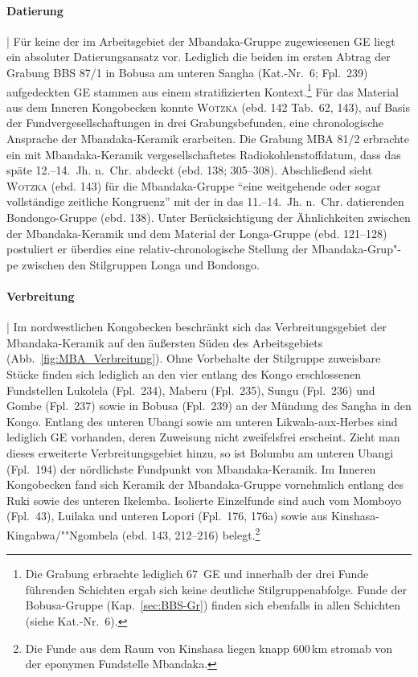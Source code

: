 \paragraph{Datierung}\hspace{-.5em}|\hspace{.5em}%
Für keine der im Arbeitsgebiet der Mbandaka-Gruppe zugewiesenen GE liegt ein absoluter Datierungsansatz vor. Lediglich die beiden im ersten Abtrag der Grabung BBS 87/1 in Bobusa am unteren \mbox{Sangha} (Kat.-Nr.~6; Fpl.~239) aufgedeckten GE stammen aus einem stratifizierten Kontext.\footnote{Die Grabung erbrachte lediglich 67~GE und innerhalb der drei Funde führenden Schichten ergab sich keine deutliche Stilgruppenabfolge. Funde der Bobusa-Gruppe (Kap.~\ref{sec:BBS-Gr}) finden sich ebenfalls in allen Schichten (siehe Kat.-Nr.~6).} Für das Material aus dem Inneren Kongobecken konnte \textsc{Wotzka} (ebd. 142 Tab.~62, 143), auf Basis der Fundvergesellschaftungen in drei Grabungsbefunden, eine chronologische Ansprache der Mbandaka-Keramik erarbeiten. Die Grabung MBA 81/2 erbrachte ein mit Mbandaka-Keramik vergesellschaftetes Radiokohlenstoffdatum, dass das späte \mbox{12.--14.~Jh.} n.~Chr. abdeckt (ebd. 138; 305--308). Abschließend sieht \textsc{Wotzka} (ebd. 143) für die Mbandaka-Gruppe \enquote{eine weitgehende oder sogar vollständige zeitliche Kongruenz} mit der in das \mbox{11.--14.~Jh.} n.~Chr. datierenden Bondongo-Gruppe (ebd. 138). Unter Berücksichtigung der Ähnlichkeiten zwischen der Mbandaka-Keramik und dem Material der Longa-Gruppe (ebd. 121--128) postuliert er überdies eine relativ-chronologische Stellung der Mbandaka-Grup"-pe zwischen den Stilgruppen Longa und Bondongo.

\paragraph{Verbreitung}\hspace{-.5em}|\hspace{.5em}%
Im nordwestlichen Kongobecken beschränkt sich das Verbreitungsgebiet der Mbandaka-Keramik auf den äußersten Süden des Arbeitsgebiets (Abb.~\ref{fig:MBA_Verbreitung}). Ohne Vorbehalte der Stilgruppe zuweisbare Stücke finden sich lediglich an den vier entlang des Kongo erschlossenen Fundstellen Lukolela (Fpl.~234), Maberu (Fpl.~235), Sungu (Fpl.~236) und Gombe (Fpl.~237) sowie in Bobusa (Fpl.~239) an der Mündung des \mbox{Sangha} in den Kongo. Entlang des unteren \mbox{Ubangi} sowie am unteren \mbox{Likwala}-\mbox{aux}-\mbox{Herbes} sind lediglich GE vorhanden, deren Zuweisung nicht zweifelsfrei erscheint. Zieht man dieses erweiterte Verbreitungsgebiet hinzu, so ist Bolumbu am unteren \mbox{Ubangi} (Fpl.~194) der nördlichste Fundpunkt von Mbandaka-Keramik. Im Inneren Kongobecken fand sich Keramik der Mbandaka-Gruppe vornehmlich entlang des Ruki sowie des unteren Ikelemba. Isolierte Einzelfunde sind auch vom Momboyo (Fpl.~43), Luilaka und unteren Lopori (Fpl.~176, 176a) sowie aus Kinshasa-Kingabwa/""Ngombela (ebd. 143, 212--216) belegt.\footnote{Die Funde aus dem Raum von Kinshasa liegen knapp 600\,km stromab von der eponymen Fundstelle Mbandaka.}